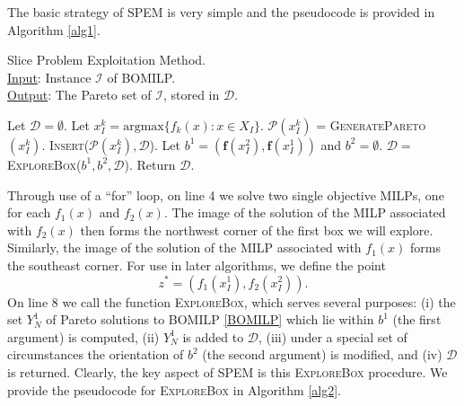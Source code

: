 \documentclass[12pt]{article}
\newcommand{\OS}{\mathcal{OS}}
\newcommand{\argmax}{\text{argmax}}
\newcommand{\objf}{\boldsymbol{f}}
\begin{document}
The basic strategy of SPEM is very simple and the pseudocode is provided in Algorithm \ref{alg1}.
\begin{algorithm}[h!] 
  \caption{Slice Problem Exploitation Method.\\
  \underline{Input}: Instance $\mathcal{I}$ of BOMILP.\\
  \underline{Output}: The Pareto set of $\mathcal{I}$, stored in $\mathscr{D}$.}
  \label{alg1}
  \begin{algorithmic}[1]
    	\State Let $\mathscr{D} = \emptyset$.
    	 	\State Let ${x}^k_I = \argmax\{f_k(x): x\in {X}_I\}$. 
    	 	\State $\mathcal{P}({x}^k_I)$ = \textsc{GeneratePareto}$({x}^k_I)$. 
    	 	\State \textsc{Insert}($\mathcal{P}({x}^k_I),\mathscr{D}$).
    	\EndFor
    	\State Let $b^1 = (\objf(x_I^2),\objf(x_I^1))$ and $b^2 = \emptyset$.
    	\State $\mathscr{D} =$ \textsc{ExploreBox}($b^1,b^2,\mathscr{D}$).
    	\State Return $\mathscr{D}$.
    \EndFunction
  \end{algorithmic}
\end{algorithm} 
Through use of a ``for'' loop, on line 4 we solve two single objective MILPs, one for each $f_1(x)$ and $f_2(x)$. The image of the solution of the MILP associated with $f_2(x)$ then forms the northwest corner of the first box we will explore. Similarly, the image of the solution of the MILP associated with $f_1(x)$ forms the southeast corner. %
For use in later algorithms, we define the point \[z^* = \left(f_1(x^1_I),f_2(x^2_I)\right).\] On line 8 we call the function \textsc{ExploreBox}, which serves several purposes: (i) the set $Y_N^1$ of Pareto solutions to BOMILP \eqref{BOMILP} which lie within  $b^1$ (the first argument) is computed, (ii) $Y_N^1$ is added to $\mathscr{D}$, (iii) under a special set of circumstances the orientation of $b^2$ (the second argument) is modified, and (iv) $\mathscr{D}$ is returned. Clearly, the key aspect of SPEM is this \textsc{ExploreBox} procedure. We provide the pseudocode for \textsc{ExploreBox} in Algorithm \ref{alg2}.
\end{document}
